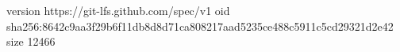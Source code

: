 version https://git-lfs.github.com/spec/v1
oid sha256:8642c9aa3f29b6f11db8d8d71ca808217aad5235ce488c5911c5cd29321d2e42
size 12466

